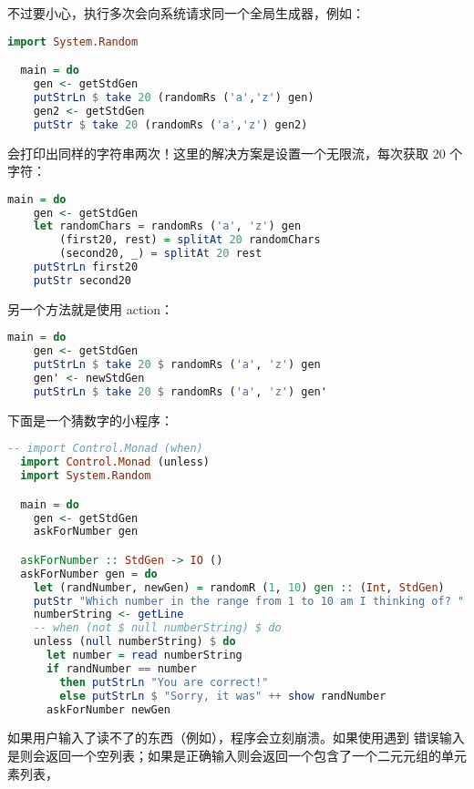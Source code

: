 \documentclass[./main.tex]{subfiles}
\begin{document}
不过要小心，执行多次会向系统请求同一个全局生成器，例如：

\begin{lstlisting}[language=Haskell]
  import System.Random

  main = do
    gen <- getStdGen
    putStrLn $ take 20 (randomRs ('a','z') gen)
    gen2 <- getStdGen
    putStr $ take 20 (randomRs ('a','z') gen2)
\end{lstlisting}

会打印出同样的字符串两次！这里的解决方案是设置一个无限流，每次获取 20 个字符：

\begin{lstlisting}[language=Haskell]
  main = do
    gen <- getStdGen
    let randomChars = randomRs ('a', 'z') gen
        (first20, rest) = splitAt 20 randomChars
        (second20, _) = splitAt 20 rest
    putStrLn first20
    putStr second20
\end{lstlisting}

另一个方法就是使用 action：

\begin{lstlisting}[language=Haskell]
  main = do
    gen <- getStdGen
    putStrLn $ take 20 $ randomRs ('a', 'z') gen
    gen' <- newStdGen
    putStrLn $ take 20 $ randomRs ('a', 'z') gen'
\end{lstlisting}

下面是一个猜数字的小程序：

\begin{lstlisting}[language=Haskell]
  -- import Control.Monad (when)
  import Control.Monad (unless)
  import System.Random

  main = do
    gen <- getStdGen
    askForNumber gen

  askForNumber :: StdGen -> IO ()
  askForNumber gen = do
    let (randNumber, newGen) = randomR (1, 10) gen :: (Int, StdGen)
    putStr "Which number in the range from 1 to 10 am I thinking of? "
    numberString <- getLine
    -- when (not $ null numberString) $ do
    unless (null numberString) $ do
      let number = read numberString
      if randNumber == number
        then putStrLn "You are correct!"
        else putStrLn $ "Sorry, it was" ++ show randNumber
      askForNumber newGen
\end{lstlisting}

\begin{anote}
  如果用户输入了读不了的东西（例如），程序会立刻崩溃。如果使用遇到
  错误输入是则会返回一个空列表；如果是正确输入则会返回一个包含了一个二元元组的单元素列表，
\end{anote}
\end{document}

